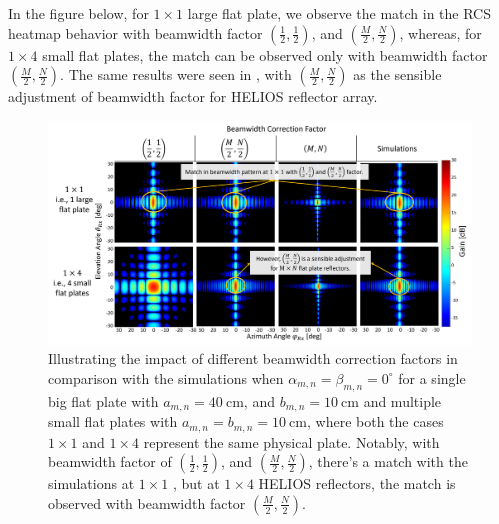 In the figure below, for $1 \times 1$ large flat plate, we observe the match in the RCS heatmap behavior with beamwidth factor $(\frac{1}{2},\frac{1}{2})$, and $(\frac{M}{2},\frac{N}{2})$, whereas, for $1 \times 4$ small flat plates, the match can be observed only with beamwidth factor $(\frac{M}{2},\frac{N}{2})$. The same results were seen in , with $(\frac{M}{2},\frac{N}{2})$ as the sensible adjustment of beamwidth factor for HELIOS reflector array.
\begin{figure}[tb]
	\centering
	\includegraphics[width=1\linewidth]{images/Section 3 Images/Casestudy_flatplate}
	\caption{Illustrating the impact of different beamwidth correction factors in comparison with the simulations when $\alpha_{m,n}=\beta_{m,n}=0^\circ$ for a single big flat plate with $a_{m,n}=\SI{40}{\centi\meter}$, and $b_{m,n}=\SI{10}{\centi\meter}$ and multiple small flat plates with $a_{m,n}=b_{m,n}=\SI{10}{\centi\meter}$, where both the cases $1 \times 1$ and $1 \times 4$ represent the same physical plate. Notably, with beamwidth factor of $(\frac{1}{2},\frac{1}{2})$, and $(\frac{M}{2},\frac{N}{2})$, there's a match with the simulations at $1 \times 1$ , but at $1 \times 4$ HELIOS reflectors, the match is observed with beamwidth factor $(\frac{M}{2},\frac{N}{2})$.}
	\label{fig:Casestudy_flatplate}
\end{figure}

